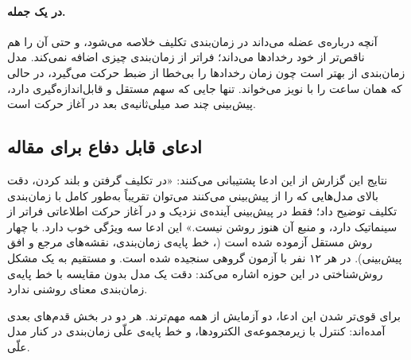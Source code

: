 \paragraph{در یک جمله.} آنچه  درباره‌ی عضله می‌داند در زمان‌بندی تکلیف خلاصه می‌شود، و حتی آن را هم ناقص‌تر از خود رخدادها می‌داند؛ فراتر از زمان‌بندی چیزی اضافه نمی‌کند. مدل زمان‌بندی از  بهتر است چون زمان رخدادها را بی‌خطا از ضبط حرکت می‌گیرد، در حالی که  همان ساعت را با نویز می‌خواند. تنها جایی که سهم مستقل و قابل‌اندازه‌گیری دارد، پیش‌بینی چند صد میلی‌ثانیه‌ی بعد در آغاز حرکت است.

\subsection{ادعای قابل دفاع برای مقاله}

نتایج این گزارش از این ادعا پشتیبانی می‌کنند: «در تکلیف گرفتن و بلند کردن، دقت بالای مدل‌هایی که  را از  پیش‌بینی می‌کنند می‌توان تقریباً به‌طور کامل با زمان‌بندی تکلیف توضیح داد؛  فقط در پیش‌بینی آینده‌ی نزدیک و در آغاز حرکت اطلاعاتی فراتر از سینماتیک دارد، و منبع آن هنوز روشن نیست.» این ادعا سه ویژگی خوب دارد. با چهار روش مستقل آزموده شده است (، خط پایه‌ی زمان‌بندی، نقشه‌های مرجع و افق پیش‌بینی). در هر ۱۲ نفر با آزمون گروهی سنجیده شده است. و مستقیم به یک مشکل روش‌شناختی در این حوزه اشاره می‌کند: دقت یک مدل  بدون مقایسه با خط پایه‌ی زمان‌بندی معنای روشنی ندارد.

برای قوی‌تر شدن این ادعا، دو آزمایش از همه مهم‌ترند. هر دو در بخش قدم‌های بعدی آمده‌اند: کنترل  با زیرمجموعه‌ی الکترودها، و خط پایه‌ی علّی زمان‌بندی در کنار مدل علّی.

